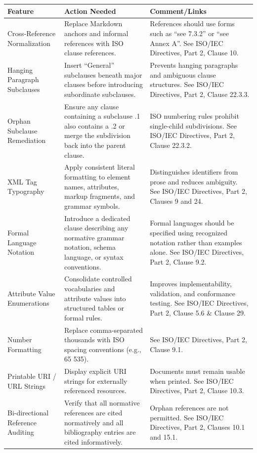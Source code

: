 \documentclass[11pt,a4paper]{article}
\begin{document}
\begin{table}[h]
\begin{tabular}{|l|l|l|}
\hline
\textbf{Feature} & \textbf{Action Needed} & \textbf{Comment/Links} \\ \hline
Cross-Reference Normalization & Replace Markdown anchors and informal references with ISO clause references. & References should use forms such as “see 7.3.2” or “see Annex A”. See ISO/IEC Directives, Part 2, Clause 10. \\ \hline
Hanging Paragraph Subclauses & Insert “General” subclauses beneath major clauses before introducing subordinate subclauses. & Prevents hanging paragraphs and ambiguous clause structures. See ISO/IEC Directives, Part 2, Clause 22.3.3. \\ \hline
Orphan Subclause Remediation & Ensure any clause containing a subclause .1 also contains a .2 or merge the subdivision back into the parent clause. & ISO numbering rules prohibit single-child subdivisions. See ISO/IEC Directives, Part 2, Clause 22.3.2. \\ \hline
XML Tag Typography & Apply consistent literal formatting to element names, attributes, markup fragments, and grammar symbols. & Distinguishes identifiers from prose and reduces ambiguity. See ISO/IEC Directives, Part 2, Clauses 9 and 24. \\ \hline
Formal Language Notation & Introduce a dedicated clause describing any normative grammar notation, schema language, or syntax conventions. & Formal languages should be specified using recognized notation rather than examples alone. See ISO/IEC Directives, Part 2, Clause 9.2. \\ \hline
Attribute Value Enumerations & Consolidate controlled vocabularies and attribute values into structured tables or formal rules. & Improves implementability, validation, and conformance testing. See ISO/IEC Directives, Part 2, Clause 5.6 \& Clause 29. \\ \hline
Number Formatting & Replace comma-separated thousands with ISO spacing conventions (e.g., 65 535). & See ISO/IEC Directives, Part 2, Clause 9.1. \\ \hline
Printable URI / URL Strings & Display explicit URI strings for externally referenced resources. & Documents must remain usable when printed. See ISO/IEC Directives, Part 2, Clause 10.3. \\ \hline
Bi-directional Reference Auditing & Verify that all normative references are cited normatively and all bibliography entries are cited informatively. & Orphan references are not permitted. See ISO/IEC Directives, Part 2, Clauses 10.1 and 15.1. \\ \hline

\end{tabular}
\end{table}
\end{document}
